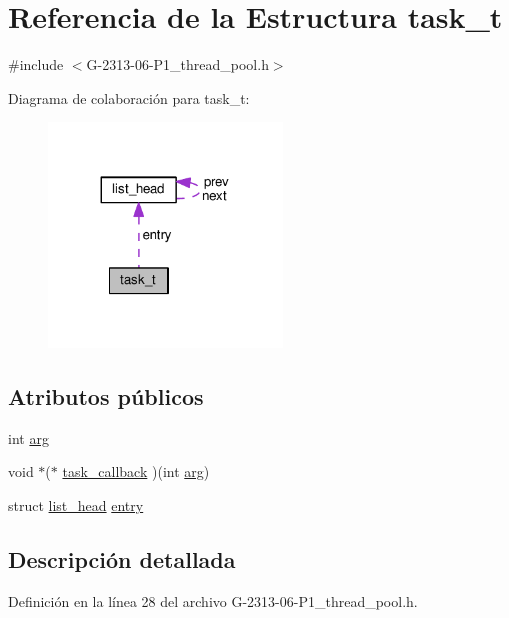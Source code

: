 \hypertarget{structtask__t}{}\section{Referencia de la Estructura task\+\_\+t}
\label{structtask__t}


{\ttfamily \#include $<$G-\/2313-\/06-\/\+P1\+\_\+thread\+\_\+pool.\+h$>$}



Diagrama de colaboración para task\+\_\+t\+:\nopagebreak
\begin{figure}[H]
\begin{center}
\leavevmode
\includegraphics[width=176pt]{structtask__t__coll__graph}
\end{center}
\end{figure}
\subsection*{Atributos públicos}
\begin{DoxyCompactItemize}
\item 
int \hyperlink{structtask__t_a9162b404bd1cf5349b2092f69e31c613}{arg}
\item 
void $\ast$($\ast$ \hyperlink{structtask__t_ac8c2d416888e415fc6ee54410a4c511c}{task\+\_\+callback} )(int \hyperlink{structtask__t_a9162b404bd1cf5349b2092f69e31c613}{arg})
\item 
struct \hyperlink{structlist__head}{list\+\_\+head} \hyperlink{structtask__t_ac812553758f9102a7a674ad29e78f98b}{entry}
\end{DoxyCompactItemize}


\subsection{Descripción detallada}


Definición en la línea 28 del archivo G-\/2313-\/06-\/\+P1\+\_\+thread\+\_\+pool.\+h.



